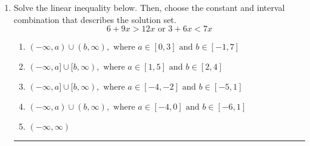 \documentclass[14pt]{extbook}
\newcommand{\litem}[1]{\item#1\hspace*{-1cm}\rule{\textwidth}{0.4pt}}
\begin{document}
\begin{enumerate}
{\begin{enumerate}[label=\Alph*.]
\end{enumerate} }
\litem{
Solve the linear inequality below. Then, choose the constant and interval combination that describes the solution set.\[ 6 + 9 x > 12 x \text{ or } 3 + 6 x < 7 x \]\begin{enumerate}[label=\Alph*.]
\item \( (-\infty, a) \cup (b, \infty), \text{ where } a \in [0, 3] \text{ and } b \in [-1, 7] \)
\item \( (-\infty, a] \cup [b, \infty), \text{ where } a \in [1, 5] \text{ and } b \in [2, 4] \)
\item \( (-\infty, a] \cup [b, \infty), \text{ where } a \in [-4, -2] \text{ and } b \in [-5, 1] \)
\item \( (-\infty, a) \cup (b, \infty), \text{ where } a \in [-4, 0] \text{ and } b \in [-6, 1] \)
\item \( (-\infty, \infty) \)

\end{enumerate} }
\end{enumerate}
\end{document}
